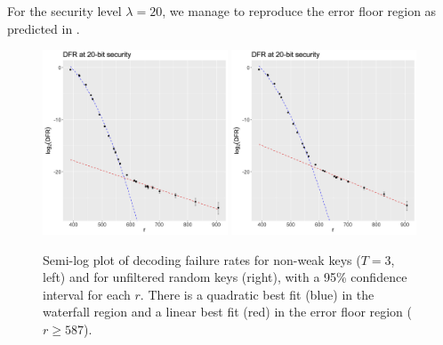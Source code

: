 For the security level $\lambda = 20$, we manage to reproduce the error floor region as predicted in \cite{Richardson03}.

\begin{figure}[htbp]
  \begin{center}
    \includegraphics[width=0.49\textwidth]{2_bike/DFR-plot-T3.png}
    \includegraphics[width=0.49\textwidth]{2_bike/DFR-plot-random.png}
  \end{center}
  \caption{Semi-log plot of decoding failure rates for non-weak keys ($T = 3$, left) and for unfiltered random keys (right), with a 95\% confidence interval for each $r$. There is a quadratic best fit (blue) in the waterfall region and a linear best fit (red) in the error floor region ($r \geq 587$).}
  \label{fig:DFR}
\end{figure}


